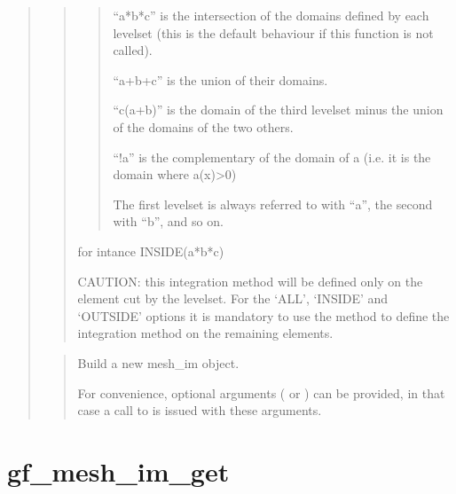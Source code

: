 \documentclass[a4paper,11pt,english]{sphinxmanual}
\begin{document}
\begin{quote}
\begin{quote}
\begin{quote}
\sphinxAtStartPar
“a*b*c” is the intersection of the domains defined by each
levelset (this is the default behaviour if this function is not
called).

\sphinxAtStartPar
“a+b+c” is the union of their domains.

\sphinxAtStartPar
“c\sphinxhyphen{}(a+b)” is the domain of the third levelset minus the union of
the domains of the two others.

\sphinxAtStartPar
“!a” is the complementary of the domain of a (i.e. it is the
domain where a(x)\textgreater{}0)

\sphinxAtStartPar
The first levelset is always referred to with “a”, the second
with “b”, and so on.
\end{quote}

\sphinxAtStartPar
for intance INSIDE(a*b*c)

\sphinxAtStartPar
CAUTION: this integration method will be defined only on the element
cut by the level\sphinxhyphen{}set. For the ‘ALL’, ‘INSIDE’ and ‘OUTSIDE’ options
it is mandatory to use the method  to define
the integration method on the remaining elements.
\end{quote}

\sphinxAtStartPar
{}
\begin{quote}

\sphinxAtStartPar
Build a new mesh\_im object.

\sphinxAtStartPar
For convenience, optional arguments ( or ) can be
provided, in that case a call to  is issued
with these arguments.
\end{quote}
\end{quote}


\section{gf\_mesh\_im\_get}
\label{\detokenize{matlab_octave/cmdref_gf_mesh_im_get:gf-mesh-im-get}}\label{\detokenize{matlab_octave/cmdref_gf_mesh_im_get::doc}}
\sphinxAtStartPar
{}
\end{document}
